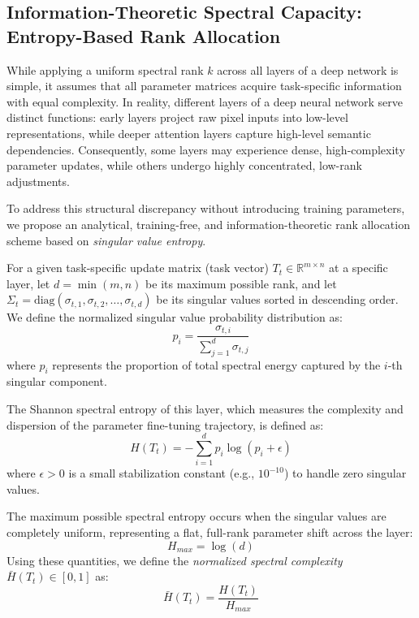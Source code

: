 \subsection{Information-Theoretic Spectral Capacity: Entropy-Based Rank Allocation}
\label{sec:entropy_rank_allocation}

While applying a uniform spectral rank $k$ across all layers of a deep network is simple, it assumes that all parameter matrices acquire task-specific information with equal complexity. In reality, different layers of a deep neural network serve distinct functions: early layers project raw pixel inputs into low-level representations, while deeper attention layers capture high-level semantic dependencies. Consequently, some layers may experience dense, high-complexity parameter updates, while others undergo highly concentrated, low-rank adjustments.

To address this structural discrepancy without introducing training parameters, we propose an analytical, training-free, and information-theoretic rank allocation scheme based on \emph{singular value entropy}.

For a given task-specific update matrix (task vector) $T_t \in \mathbb{R}^{m \times n}$ at a specific layer, let $d = \min(m, n)$ be its maximum possible rank, and let $\Sigma_t = \text{diag}(\sigma_{t, 1}, \sigma_{t, 2}, \dots, \sigma_{t, d})$ be its singular values sorted in descending order. We define the normalized singular value probability distribution as:
\begin{equation}
    p_i = \frac{\sigma_{t, i}}{\sum_{j=1}^d \sigma_{t, j}}
\end{equation}
where $p_i$ represents the proportion of total spectral energy captured by the $i$-th singular component.

The Shannon spectral entropy of this layer, which measures the complexity and dispersion of the parameter fine-tuning trajectory, is defined as:
\begin{equation}
    H(T_t) = -\sum_{i=1}^d p_i \log(p_i + \epsilon)
\end{equation}
where $\epsilon > 0$ is a small stabilization constant (e.g., $10^{-10}$) to handle zero singular values. 

The maximum possible spectral entropy occurs when the singular values are completely uniform, representing a flat, full-rank parameter shift across the layer:
\begin{equation}
    H_{max} = \log(d)
\end{equation}
Using these quantities, we define the \emph{normalized spectral complexity} $\bar{H}(T_t) \in [0, 1]$ as:
\begin{equation}
    \bar{H}(T_t) = \frac{H(T_t)}{H_{max}}
\end{equation}

